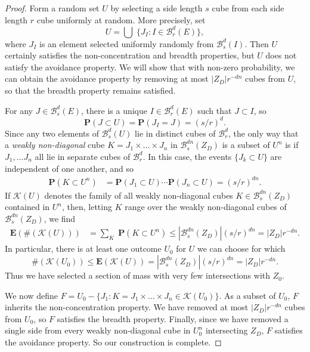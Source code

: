 \documentclass[dvipsnames]{article}
\theoremstyle{plain}
\theoremstyle{plain}
\begin{document}
\begin{proof}
	Form a random set $U$ by selecting a side length $s$ cube from each side length $r$ cube uniformly at random. More precisely, set
	\[ U = \bigcup\; \{ J_I: I \in \mathcal{B}^d_r(E) \}, \]
	where $J_I$ is an element selected uniformly randomly from $\mathcal{B}^d_s(I)$. Then $U$ certainly satisfies the non-concentration and breadth properties, but $U$ does not satisfy the avoidance property. We will show that with non-zero probability, we can obtain the avoidance property by removing at most $|Z_D|r^{-dn}$ cubes from $U$, so that the breadth property remains satisfied.

	For any $J \in \mathcal{B}^d_s(E)$, there is a unique $I \in \mathcal{B}^d_r(E)$ such that $J \subset I$, so
	\[ \mathbf{P}(J \subset U) = \mathbf{P}(J_I = J) = (s/r)^d. \]
	Since any two elements of $\mathcal{B}^d_s(U)$ lie in distinct cubes of $\mathcal{B}^d_r$, the only way that a {\it weakly non-diagonal} cube $K = J_1 \times \dots \times J_n$ in $\mathcal{B}^{dn}_s(Z_D)$ is a subset of $U^n$ is if $J_1, \dots J_n$ all lie in separate cubes of $\mathcal{B}^d_r$. In this case, the events $\{ J_k \subset U \}$ are independent of one another, and so
	\begin{align*}
		\mathbf{P}(K \subset U^n) &= \mathbf{P}(J_1 \subset U) \cdots \mathbf{P}(J_n \subset U) = (s/r)^{dn}.
	\end{align*}
	If $\mathcal{K}(U)$ denotes the family of all weakly non-diagonal cubes $K \in \mathcal{B}^{dn}_s(Z_D)$ contained in $U^n$, then, letting $K$ range over the weakly non-diagonal cubes of $\mathcal{B}^{dn}_s(Z_D)$, we find
	\begin{align*}
		\mathbf{E}(\# (\mathcal{K}(U))) &= {\sum}_K\; \mathbf{P}(K \subset U^n) \leq |\mathcal{B}^{dn}_s(Z_D)| (s/r)^{dn} = |Z_D| r^{-dn}.
	\end{align*}
	In particular, there is at least one outcome $U_0$ for $U$ we can choose for which
	\[ \#(\mathcal{K}(U_0)) \leq \mathbf{E}(\mathcal{K}(U)) = |\mathcal{B}^{dn}_s(Z_D)| (s/r)^{dn} = |Z_D| r^{-dn}. \]
	Thus we have selected a section of mass with very few intersections with $Z_0$.

	We now define $F = U_0 - \{ J_1 : K = J_1 \times \dots \times J_n \in \mathcal{K}(U_0) \}$. As a subset of $U_0$, $F$ inherits the non-concentration property. We have removed at most $|Z_D| r^{-dn}$ cubes from $U_0$, so $F$ satisfies the breadth property. Finally, since we have removed a single side from every weakly non-diagonal cube in $U_0^n$ intersecting $Z_D$, $F$ satisfies the avoidance property. So our construction is complete.
\end{proof}
\end{document}
